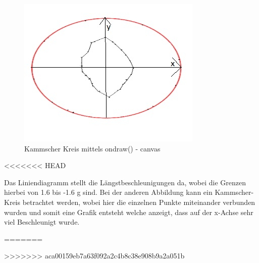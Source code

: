 \begin{figure}[!tbp]
\begin{minipage}[b]{0.4\textwidth}
 		\includegraphics[width=\textwidth]{images/Kammscherkreis-u}
 		\caption{Kammscher Kreis mittels ondraw() - canvas}
 	\end{minipage}
\end{figure}
<<<<<<< HEAD

Das Liniendiagramm stellt die Längstbeschleunigungen da, wobei die Grenzen hierbei von 1.6 bis -1.6 g sind.
Bei der anderen Abbildung kann ein Kammscher-Kreis betrachtet werden, wobei hier die einzelnen Punkte miteinander verbunden wurden und somit eine Grafik entsteht welche anzeigt, dass auf der x-Achse sehr viel Beschleunigt wurde.

=======
 
>>>>>>> aca00159eb7a63f092a2c4b8c38e908b9a2a051b
\clearpage %